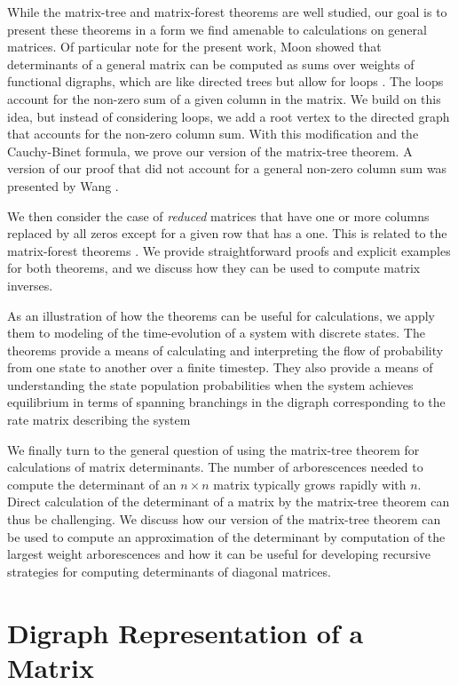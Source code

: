 \documentclass{article}
\begin{document}
While the matrix-tree and matrix-forest theorems are well studied, our goal is to present these theorems in a form we find amenable to calculations on general matrices.  Of particular note for the present work, Moon showed that determinants of a general matrix can be computed as sums over weights of functional digraphs, which are like directed trees but allow for loops \cite{MOON1994163}.  The loops account for the non-zero sum of a given column in the matrix.  We build on this idea, but instead of considering loops, we add a root vertex to the directed graph that accounts for the non-zero column sum.  With this modification and the Cauchy-Binet formula, we prove our version of the matrix-tree theorem.  A version of our proof that did not account for a general non-zero column sum was presented by Wang \cite{wang2009branchings}.

We then consider the case of {\em reduced} matrices that have one or more columns replaced by all zeros except for a given row that has a one.  This is related to the matrix-forest theorems \cite{chen2012applied, chaikenSeth, MOON1994163, chebotarev2006matrixforest}.  We provide straightforward proofs and explicit examples for both theorems, and we discuss how they can be used to compute matrix inverses.

As an illustration of how the theorems can be useful for calculations, we apply them to modeling of the time-evolution of a system with discrete states.  The theorems provide a means of calculating and interpreting the flow of probability from one state to another over a finite timestep.  They also provide a means of understanding the state population probabilities when the system achieves equilibrium in terms of spanning branchings in the digraph corresponding to the rate matrix describing the system

We finally turn to the general question of using the matrix-tree theorem for calculations of matrix determinants.  The number of arborescences needed to compute the determinant of an $n\times n$ matrix typically grows rapidly with $n$.  Direct calculation of the determinant of a matrix by the matrix-tree theorem can thus be challenging.  We discuss how our version of the matrix-tree theorem can be used to compute an approximation of the determinant by computation of the largest weight arborescences and how it can be useful for developing recursive strategies for computing determinants of diagonal matrices.

\section{Digraph Representation of a Matrix}
\label{sec:digraphs_and_matrices}
\end{document}
